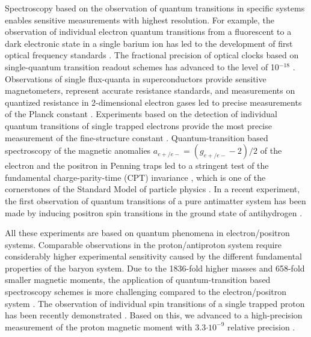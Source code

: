\documentclass[12pt,preprint%
]{elsarticle}
\begin{document}

Spectroscopy based on the observation of quantum transitions in specific systems enables sensitive measurements with highest resolution. For example, the observation of individual electron quantum transitions from a fluorescent to a dark electronic state in a single barium ion \cite{ToschekBaIon,DehmeltBaIon} has led to the development of first optical frequency standards \cite{Bergquist1986}. The fractional precision of optical clocks based on single-quantum transition readout schemes has advanced to the level of 10$^{-18}$ \cite{SingleIonClock}. Observations of single flux-quanta in superconductors provide sensitive magnetometers, represent accurate resistance standards, and measurements on quantized resistance in 2-dimensional electron gases led to precise measurements of the Planck constant \cite{h2011,h2012}. Experiments based on the detection of individual quantum transitions of single trapped electrons provide the most precise measurement of the fine-structure constant \cite{Hanneke2008}. Quantum-transition based spectroscopy of the magnetic anomalies $a_{e+/e-} = (g_{e+/e-}-2)/2$ of the electron and the positron in Penning traps led to a stringent test of the fundamental charge-parity-time (CPT) invariance \cite{Dehmelt,DehmeltCPT}, which is one of the cornerstones of the Standard Model of particle physics \cite{CPT}. In a recent experiment, the first observation of quantum transitions of a pure antimatter system has been made by inducing positron spin transitions in the ground state of antihydrogen \cite{ALPHA2012}.

All these experiments are based on quantum phenomena in electron/positron systems. Comparable observations in the proton/antiproton system require considerably higher experimental sensitivity caused by the different fundamental properties of the baryon system. Due to the 1836-fold higher masses and 658-fold smaller magnetic moments, the application of quantum-transition based spectroscopy schemes is more challenging compared to the electron/positron system \cite{DehmeltCSGE}. The observation of individual spin transitions of a single trapped proton has been recently demonstrated \cite{MooserPRL2013,JackPRL2013}. Based on this, we advanced to a high-precision measurement of the proton magnetic moment with 3.3$\cdot10^{-9}$ relative precision \cite{MooserNature2014}. 
\end{document}
